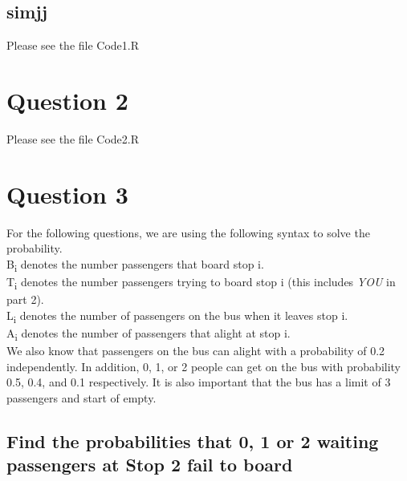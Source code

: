 \documentclass{article}
\numberwithin{equation}{section}
\begin{document}
\subsection{simjj}

Please see the file Code1.R

\section{Question 2}

Please see the file Code2.R

\section{Question 3}
For the following questions, we are using the following syntax to solve the probability.
\\ \indent 
B\textsubscript{i} denotes the number passengers that board stop i.
\\ \indent 
T\textsubscript{i} denotes the number passengers trying to board stop i (this includes \textit{YOU} in part 2).
\\ \indent
L\textsubscript{i} denotes the number of passengers on the bus when it leaves stop i.
\\ \indent
A\textsubscript{i} denotes the number of passengers that alight at stop i.
\\ We also know that passengers on the bus can alight with a probability of 0.2 independently. In addition, 0, 1, or 2 people can get on the bus with probability 0.5, 0.4, and 0.1 respectively. It is also important that the bus has a limit of 3 passengers and start of empty.

\subsection{Find the probabilities that 0, 1 or 2 waiting passengers at Stop 2 fail to board}
\end{document}
